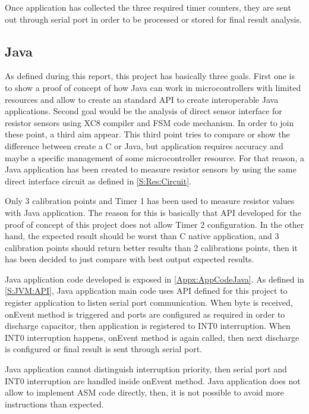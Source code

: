 Once application has collected the three required timer counters, they are sent out through serial port in order to be processed or stored for final result analysis.

\subsection{Java}\label{SS:Res:Code:Java}
As defined during this report, this project has basically three goals. First one is to show a proof of concept of how Java can work in microcontrollers with limited resources and allow to create an standard API to create interoperable Java applications. Second goal would be the analysis of direct sensor interface for resistor sensors using XC8 compiler and FSM code mechanism. In order to join these point, a third aim appear. This third point tries to compare or show the difference between create a C or Java, but application requires accuracy and maybe a specific management of some microcontroller resource. For that reason, a Java application has been created to measure resistor sensors by using the same direct interface circuit as defined in \ref{S:Res:Circuit}.

Only 3 calibration points and Timer 1 has been used to measure resistor values with Java application. The reason for this is basically that API developed for the proof of concept of this project does not allow Timer 2 configuration. In the other hand, the expected result should be worst than C native application, and 3 calibration points should return better results than 2 calibrations points, then it has been decided to just compare with best output expected results.

Java application code developed is exposed in \ref{Appx:AppCodeJava}. As defined in \ref{S:JVM:API}, Java application main code uses API defined for this project to register application to listen serial port communication. When byte is received, onEvent method is triggered and ports are configured as required in order to discharge capacitor, then application is registered to INT0 interruption. When INT0 interruption happens, onEvent method is again called, then next discharge is configured or final result is sent through serial port.

Java application cannot distinguish interruption priority, then serial port and INT0 interruption are handled inside onEvent method. Java application does not allow to implement ASM code directly, then, it is not possible to avoid more instructions than expected.